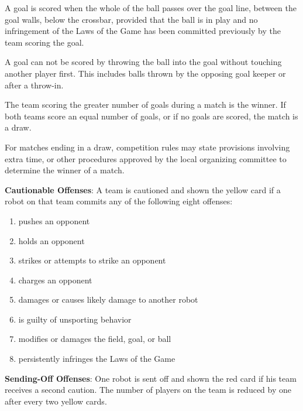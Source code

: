 \documentclass[12pt]{hurocup}
\begin{document}
\begin{lawlist}[US]
  
\item A goal is scored when the whole of the ball passes over the goal
  line, between the goal walls, below the crossbar, provided that the
  ball is in play and no infringement of the Laws of the Game has been
  committed previously by the team scoring the goal. 

\item A goal can not be scored by throwing the ball into the
  goal without touching another player first. This includes balls
  thrown by the opposing goal keeper or after a throw-in.
  
\item The team scoring the greater number of goals during a match is
  the winner. If both teams score an equal number of goals, or if no
  goals are scored, the match is a draw.
  
\item For matches ending in a draw, competition rules may state
  provisions involving extra time, or other procedures approved by the
  local organizing committee to determine the winner of a match.
\end{lawlist}

\label{law:penalties}

\begin{lawlist}[US]

\item \textbf{Cautionable Offenses}: A team is cautioned and shown the
  yellow card if a robot on that team commits any of the following
  eight offenses:
  \begin{enumerate}
    \item pushes an opponent
    \item holds an opponent
    \item strikes or attempts to strike an opponent
    \item charges an opponent
    \item damages or causes likely damage to another robot
    \item is guilty of unsporting behavior
    \item modifies or damages the field, goal, or ball
    \item persistently infringes the Laws of the Game
  \end{enumerate}
\item \textbf{Sending-Off Offenses}: One robot is sent off and shown the red
  card if his team receives a second caution. The number of players on
  the team is reduced by one after every two yellow cards.
\end{lawlist}
\end{document}
